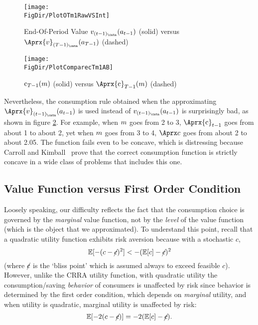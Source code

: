 \hypertarget{PlotOTm1RawVSInt}{}
\begin{figure}
  \centerline{\texttt{[image: \\FigDir/PlotOTm1RawVSInt]}}
  \caption{End-Of-Period Value $\vFunc_{({\prdT-1})_\cntn}({a}_{\prdT-1})$ (solid) versus $\Aprx{\vFunc}_{({\trmT-1})_\cntn}({a}_{\trmT-1})$ (dashed)}
  \label{fig:PlotOTm1RawVSInt}
\end{figure}

\hypertarget{PlotComparecTm1AB}{}
\begin{figure}
  \centerline{\texttt{[image: \\FigDir/PlotComparecTm1AB]}}
  \caption{$\mathrm{c}_{T-1}(m)$ (solid) versus $\Aprx{\cFunc}_{\trmT-1}(\mNrm)$ (dashed)}
  \label{fig:PlotComparecTm1AB}
\end{figure}


Nevertheless, the consumption rule obtained when the approximating $\Aprx{\vFunc}_{({\prdT-1})_\cntn}({a}_{\prdT-1})$ is used instead of $\vFunc_{({\prdT-1})_\cntn}({a}_{\prdT-1})$ is surprisingly bad, as shown in figure \ref{fig:PlotComparecTm1AB}.  For example, when $m$ goes from 2 to 3, $\Aprx{\cFunc}_{\prdT-1}$ goes from about 1 to about 2, yet when $m$ goes from 3 to 4, $\Aprx\cNrm$ goes from about 2 to about 2.05.  The function fails even to be concave, which is distressing because Carroll and Kimball~\citeyearpar{ckConcavity} prove that the correct consumption function is strictly concave in a wide class of problems that includes this one.

\hypertarget{value-function-versus-first-order-condition}{}
\subsection{Value Function versus First Order Condition}\label{subsec:vVsuP}

Loosely speaking, our difficulty reflects the fact that the
consumption choice is governed by the \textit{marginal} value function,
not by the \textit{level} of the value function (which is the object that
we approximated).  To understand this point, recall that a quadratic
utility function
exhibits risk aversion because with a stochastic ${c}$,
\begin{equation}
  \operatorname{\mathbb{E}}[-({c} - \cancel{c})^{2}] < - (\operatorname{\mathbb{E}}[{c}] - \cancel{c})^{2}
\end{equation}
(where $\cancel{c}$ is the `bliss point' which is assumed always to exceed feasible ${c}$). However, unlike the CRRA utility function,
with quadratic utility the consumption/saving \textit{behavior} of consumers
is unaffected by risk since behavior is determined by the first order condition, which
depends on \textit{marginal} utility, and when utility is quadratic, marginal utility is unaffected
by risk:
\begin{equation}
  \operatorname{\mathbb{E}}[-2({c} - \cancel{c})] = - 2(\operatorname{\mathbb{E}}[{c}] - \cancel{c}).
\end{equation}

